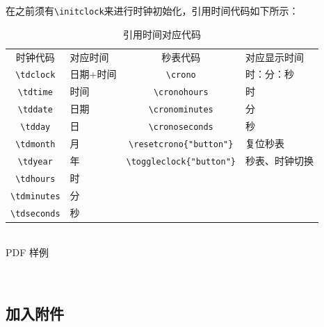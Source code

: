 在之前须有\verb|\initclock|来进行时钟初始化，引用时间代码如下所示：\\
\begin{table}[ht]
\caption{引用时间对应代码} \centering
{}
\begin{tabular}{clcl}
\toprule
时钟代码 & 对应时间 & 秒表代码 & 对应显示时间\\
  \verb|\tdclock| & 日期+时间 & \verb|\crono| & 时：分：秒 \\
  \verb|\tdtime| & 时间 & \verb|\cronohours| & 时 \\
  \verb|\tddate| & 日期 & \verb|\cronominutes| & 分 \\
  \verb|\tdday| & 日 &  \verb|\cronoseconds| & 秒  \\
  \verb|\tdmonth| & 月 & \verb|\resetcrono{"button"}| & 复位秒表 \\
  \verb|\tdyear| & 年 & \verb|\toggleclock{"button"}|& 秒表、时钟切换\\
  \verb|\tdhours| & 时 && \\
  \verb|\tdminutes| & 分 && \\
  \verb|\tdseconds| & 秒 && \\
  \bottomrule
\end{tabular}
\end{table}
~\\
PDF 样例\\
\begin{center}
\\
\end{center}

\subsection{加入附件}

